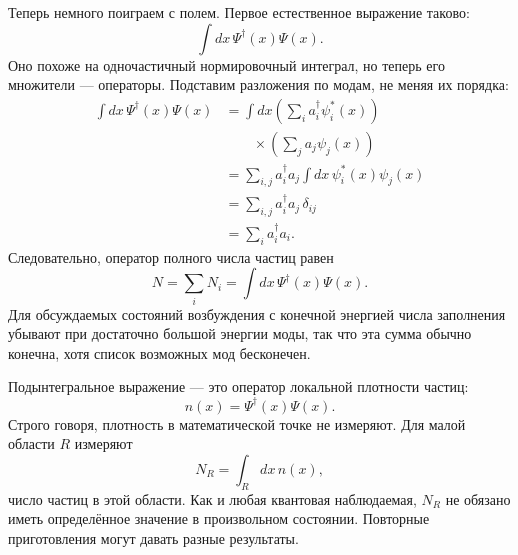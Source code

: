Теперь немного поиграем с полем. Первое естественное выражение таково:
\begin{equation}
\int dx\,\Psi^\dagger(x)\Psi(x).
\end{equation}
Оно похоже на одночастичный нормировочный интеграл, но теперь его множители — операторы. Подставим разложения по модам, не меняя их порядка:
\begin{align}
\int dx\,\Psi^\dagger(x)\Psi(x)
&=\int dx
\left(\sum_i a_i^\dagger\psi_i^*(x)\right)\\
&\qquad\times\left(\sum_j a_j\psi_j(x)\right) \\
&=\sum_{i,j}a_i^\dagger a_j
\int dx\,\psi_i^*(x)\psi_j(x) \\
&=\sum_{i,j}a_i^\dagger a_j\,\delta_{ij} \\
&=\sum_i a_i^\dagger a_i.
\label{eq:l07-number-derivation}
\end{align}
Следовательно, оператор полного числа частиц равен
\begin{equation}
N=\sum_i N_i
=\int dx\,\Psi^\dagger(x)\Psi(x).
\label{eq:l07-total-number}
\end{equation}
Для обсуждаемых состояний возбуждения с конечной энергией числа заполнения убывают при достаточно большой энергии моды, так что эта сумма обычно конечна, хотя список возможных мод бесконечен.

Подынтегральное выражение — это оператор локальной плотности частиц:
\begin{equation}
n(x)=\Psi^\dagger(x)\Psi(x).
\label{eq:l07-density}
\end{equation}
Строго говоря, плотность в математической точке не измеряют. Для малой области \(R\) измеряют
\begin{equation}
N_R=\int_R dx\,n(x),
\label{eq:l07-regional-number}
\end{equation}
число частиц в этой области. Как и любая квантовая наблюдаемая, \(N_R\) не обязано иметь определённое значение в произвольном состоянии. Повторные приготовления могут давать разные результаты.

\begin{classroomqa}
\end{classroomqa}

